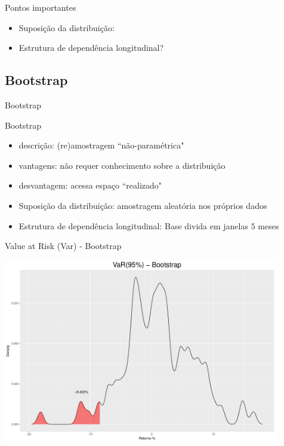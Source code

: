 \documentclass{beamer}
\begin{document}
\begin{frame}{Pontos importantes}
\begin{itemize}
\item Suposição da distribuição:
\item Estrutura de dependência longitudinal?
\end{itemize}
\end{frame}

\subsection{Bootstrap}

\begin{frame}{ }
    \begin{block}{ }
      \Huge  Bootstrap
    \end{block}
\end{frame}



\begin{frame}{ Bootstrap}


\begin{itemize}
\item descrição: (re)amostragem ``não-paramétrica"
\item vantagens: não requer conhecimento sobre a distribuição
\item desvantagem: acessa espaço ``realizado"
\end{itemize}

\pause

\begin{itemize}
\item Suposição da distribuição: amostragem aleatória nos próprios dados
\item Estrutura de dependência longitudinal: Base divida em janelas $5$ meses
\end{itemize}
 
\end{frame}




\begin{frame}{Value at Risk (Var) - Bootstrap}

\begin{center}
 \includegraphics[height=8cm,keepaspectratio]{VAR_boots.pdf}
 \end{center}
 
\end{frame}
\end{document}
